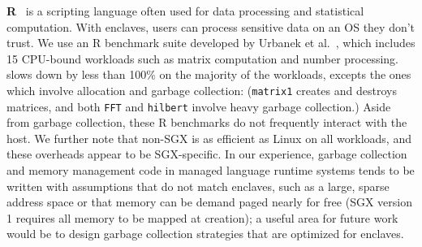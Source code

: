 {\bf R}~\cite{r-project} is a scripting language often used for
data processing and statistical computation.
With enclaves, users can process sensitive data on an
OS they don't trust.
We use an R benchmark suite developed by Urbanek et al.~\cite{r-benchmark-25}, which includes 15 CPU-bound workloads such as matrix computation and number processing.
\graphenesgx{} slows down by less than 100\% on the majority of the workloads, excepts the ones which involve allocation and garbage collection: ({\tt matrix1} creates and destroys matrices, and both {\tt FFT} and {\tt hilbert} involve heavy garbage collection.)
Aside from garbage collection, these R benchmarks do not frequently interact with the host.
We further note that non-SGX \graphene{} is as efficient as Linux on all workloads, 
and these overheads appear to be SGX-specific.
In our experience, garbage collection and memory management code in managed language runtime
systems tends to be written with assumptions that do not match enclaves,
such as a large, sparse address space or that memory can be demand paged 
nearly for free (SGX version 1 requires all memory to be mapped
at creation); a useful area for future work would be to design
garbage collection strategies that are optimized for enclaves.
 
